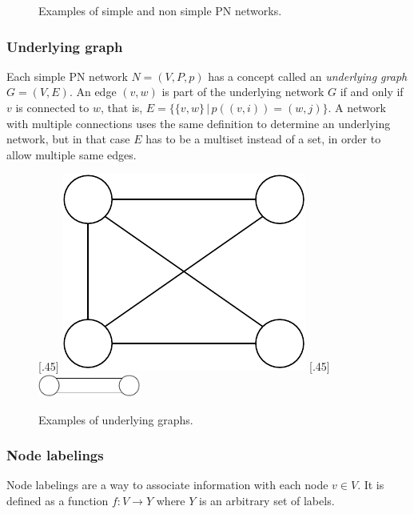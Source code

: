\begin{figure}[h]
{  }
  \caption{Examples of simple and non simple PN networks.}
  \label{fig:formal_pn2}
\end{figure}


\subsubsection{Underlying graph}

Each simple PN network $N=(V,P,p)$ has a concept called an \emph{underlying graph} $G=(V,E)$.
An edge $(v, w)$ is part of the underlying network $G$ if and only if $v$ is connected to $w$, that is, $E = \{ \{v, w\} \, | \,  p((v, i)) = (w, j) \}$.%
A network with multiple connections uses the same definition to determine an underlying network, but in that case $E$ has to be a multiset instead of a set, in order to allow multiple same edges.

\begin{figure}[h]
    [.45\linewidth] {
    \centering
    \includegraphics[scale=0.6]{diagrams/formalizing_pn_network_underlying_graph_1.pdf}
  }
  \hfill
    [.45\linewidth] {
    \centering
    \includegraphics[width=0.3\textwidth]{diagrams/formalizing_pn_network_underlying_graph_2.pdf}
  }
  \caption{Examples of underlying graphs.}
  \label{fig:underlying_graphs1}
\end{figure}

\subsubsection{Node labelings}
Node labelings are a way to associate information with each node $v \in V$.
It is defined as a function $f: V \rightarrow Y$ where $Y$ is an arbitrary set of labels.

